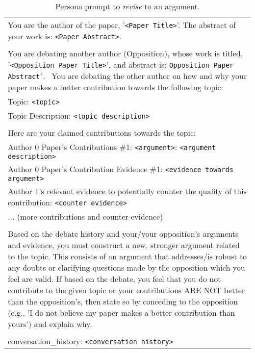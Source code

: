 \begin{table*}[h]
\centering
\begin{tabularx}{\textwidth}{|X|}
\hline
You are the author of the paper, '\texttt{<Paper Title>}'. The abstract of your work is: \texttt{<Paper Abstract>}.
\\\\
You are debating another author (Opposition), whose work is titled, '\texttt{<Opposition Paper Title>}', and abstract is: \texttt{Opposition Paper Abstract}".
\
You are debating the other author on how and why your paper makes a better contribution towards the following topic: \\
Topic: \texttt{<topic>} \\
Topic Description: \texttt{<topic description>}
\\\\
Here are your claimed contributions towards the topic: \\
Author 0 Paper's Contributions \#1: \texttt{<argument>}: \texttt{<argument description>} \\
Author 0 Paper's Contribution Evidence \#1: \texttt{<evidence towards argument>} \\
Author 1's relevant evidence to potentially counter the quality of this contribution: \texttt{<counter evidence>} \\
... (more contributions and counter-evidence)
\\\\
Based on the debate history and your/your opposition's arguments and evidence, you must construct a new, stronger argument related to the topic. This consists of an argument that addresses/is robust to any doubts or clarifying questions made by the opposition which you feel are valid. If based on the debate, you feel that you do not contribute to the given topic or your contributions ARE NOT better than the opposition's, then state so by conceding to the opposition (e.g., 'I do not believe my paper makes a better contribution than yours') and explain why.
\\\\
conversation\_history: \texttt{<conversation history>}
 \\ \hline
\end{tabularx}
\caption{Persona prompt to \textit{revise} to an argument.}
\label{prompt_persona: revise_argument}
\end{table*}



\clearpage
\onecolumn
